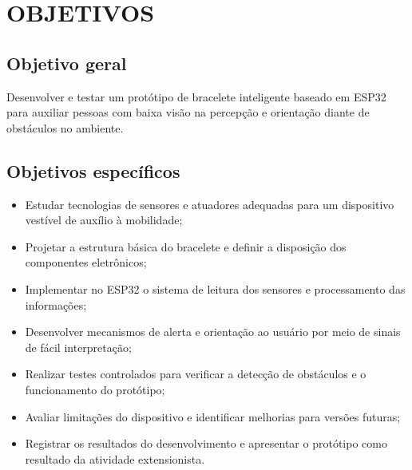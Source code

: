 \chapter{OBJETIVOS}
\label{capitulo-objetivo}

\section{Objetivo geral}
\label{sec:objetivo-geral}

Desenvolver e testar um protótipo de bracelete inteligente baseado em ESP32 para auxiliar pessoas com baixa visão na percepção e orientação diante de obstáculos no ambiente.

\section{Objetivos específicos}
\label{sec:objetivos-especificos}

\begin{itemize}
    \item Estudar tecnologias de sensores e atuadores adequadas para um dispositivo vestível de auxílio à mobilidade;
    \item Projetar a estrutura básica do bracelete e definir a disposição dos componentes eletrônicos;
    \item Implementar no ESP32 o sistema de leitura dos sensores e processamento das informações;
    \item Desenvolver mecanismos de alerta e orientação ao usuário por meio de sinais de fácil interpretação;
    \item Realizar testes controlados para verificar a detecção de obstáculos e o funcionamento do protótipo;
    \item Avaliar limitações do dispositivo e identificar melhorias para versões futuras;
    \item Registrar os resultados do desenvolvimento e apresentar o protótipo como resultado da atividade extensionista.
\end{itemize}

